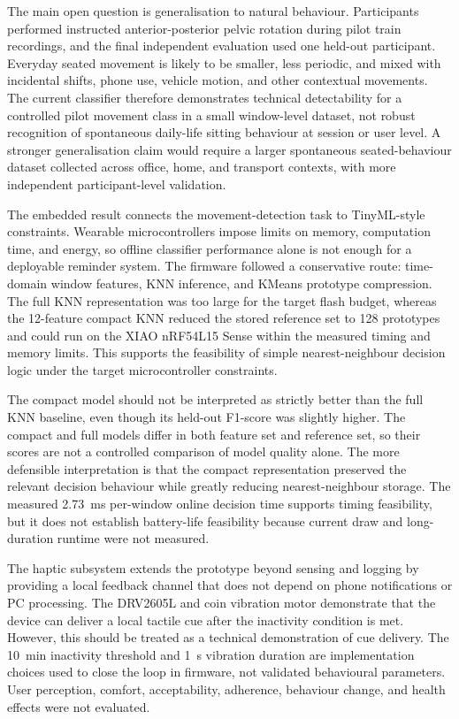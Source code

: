 The main open question is generalisation to natural behaviour. Participants performed instructed anterior-posterior pelvic rotation during pilot train recordings, and the final independent evaluation used one held-out participant. Everyday seated movement is likely to be smaller, less periodic, and mixed with incidental shifts, phone use, vehicle motion, and other contextual movements. The current classifier therefore demonstrates technical detectability for a controlled pilot movement class in a small window-level dataset, not robust recognition of spontaneous daily-life sitting behaviour at session or user level. A stronger generalisation claim would require a larger spontaneous seated-behaviour dataset collected across office, home, and transport contexts, with more independent participant-level validation.

The embedded result connects the movement-detection task to TinyML-style constraints. Wearable microcontrollers impose limits on memory, computation time, and energy, so offline classifier performance alone is not enough for a deployable reminder system. The firmware followed a conservative route: time-domain window features, KNN inference, and KMeans prototype compression. The full KNN representation was too large for the target flash budget, whereas the 12-feature compact KNN reduced the stored reference set to 128 prototypes and could run on the XIAO nRF54L15 Sense within the measured timing and memory limits. This supports the feasibility of simple nearest-neighbour decision logic under the target microcontroller constraints.

The compact model should not be interpreted as strictly better than the full KNN baseline, even though its held-out F1-score was slightly higher. The compact and full models differ in both feature set and reference set, so their scores are not a controlled comparison of model quality alone. The more defensible interpretation is that the compact representation preserved the relevant decision behaviour while greatly reducing nearest-neighbour storage. The measured 2.73~ms per-window online decision time supports timing feasibility, but it does not establish battery-life feasibility because current draw and long-duration runtime were not measured.

The haptic subsystem extends the prototype beyond sensing and logging by providing a local feedback channel that does not depend on phone notifications or PC processing. The DRV2605L and coin vibration motor demonstrate that the device can deliver a local tactile cue after the inactivity condition is met. However, this should be treated as a technical demonstration of cue delivery. The 10~min inactivity threshold and 1~s vibration duration are implementation choices used to close the loop in firmware, not validated behavioural parameters. User perception, comfort, acceptability, adherence, behaviour change, and health effects were not evaluated.

